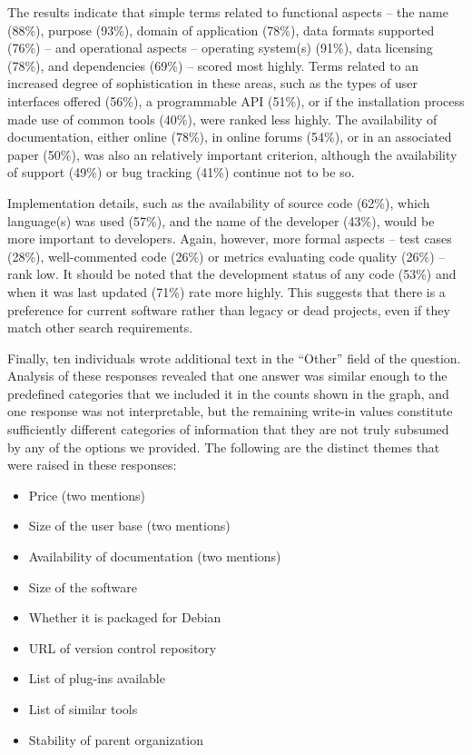 \documentclass{casicswhitepaper}
\begin{document}
The results indicate that simple terms related to functional aspects -- the name (88\%), purpose (93\%), domain of application (78\%), data formats supported (76\%) -- and operational aspects -- operating system(s) (91\%), data licensing (78\%), and dependencies (69\%) -- scored most highly. Terms related to an increased degree of sophistication in these areas, such as the types of user interfaces offered (56\%), a programmable API (51\%), or if the installation process made use of common tools (40\%), were ranked less highly.  The availability of documentation, either online (78\%), in online forums (54\%), or in an associated paper (50\%), was also an relatively important criterion, although the availability of support (49\%) or bug tracking (41\%) continue not to be so.

Implementation details, such as the availability of source code (62\%), which language(s) was used (57\%), and the name of the developer (43\%), would be more important to developers. Again, however, more formal aspects -- test cases (28\%), well-commented code (26\%) or metrics evaluating code quality (26\%) -- rank low. It should be noted that the development status of any code (53\%) and when it was last updated (71\%) rate more highly. This suggests that there is a preference for current software rather than legacy or dead projects, even if they match other search requirements.

Finally, ten individuals wrote additional text in the ``Other'' field of the question.  Analysis of these responses revealed that one answer was similar enough to the predefined categories that we included it in the counts shown in the graph, and one response was not interpretable, but the remaining write-in values constitute sufficiently different categories of information that they are not truly subsumed by any of the options we provided.  The following are the distinct themes that were raised in these responses:

\begin{itemize}[itemsep=0ex]

\item Price (two mentions)
\item Size of the user base (two mentions)
\item Availability of documentation (two mentions)
\item Size of the software
\item Whether it is packaged for Debian
\item URL of version control repository
\item List of plug-ins available
\item List of similar tools
\item Stability of parent organization

\end{itemize}
\end{document}

